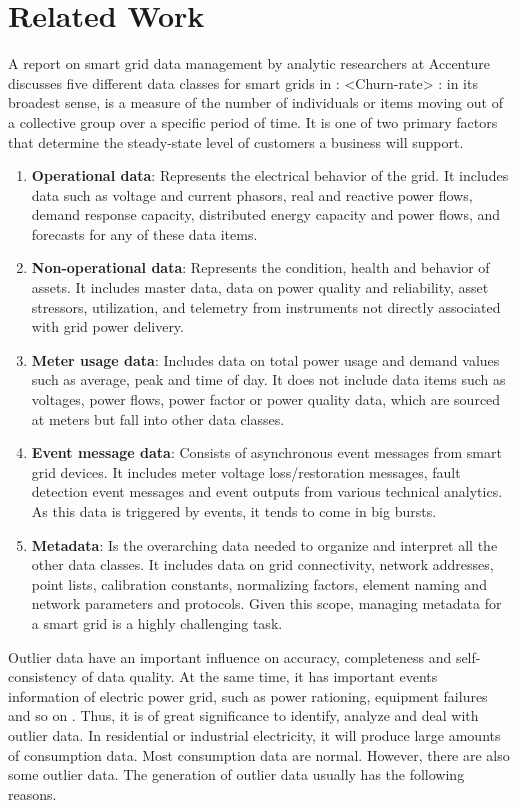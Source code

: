 \chapter{Related Work}
A report on smart grid data management by analytic researchers at Accenture discusses five different data classes for smart grids in \cite{analytics2010achieving}: 
<Churn-rate> : in its broadest sense, is a measure of the number of individuals or items moving out of a collective group over a specific period of time. It is one of two primary factors that determine the steady-state level of customers a business will support.
\begin{enumerate}
 \item \textbf{Operational data}: Represents the electrical behavior of the grid. It includes data such as voltage and current phasors, real and reactive power flows, demand response capacity, distributed energy capacity and power flows, and forecasts for any of these data items.
\item \textbf{Non-operational data}: Represents the condition, health and behavior of assets. It includes master data, data on power quality and reliability, asset stressors, utilization, and telemetry from instruments not directly associated with grid power delivery.
\item \textbf{Meter usage data}: Includes data on total power usage and demand values such as average, peak and time of day. It does not include data items such as voltages, power flows, power factor or power quality data, which are sourced at meters but fall into other data classes.
\item \textbf{Event message data}: Consists of asynchronous event messages from smart grid devices. It includes meter voltage loss/restoration messages, fault detection event messages and event outputs from various technical analytics. As this data is triggered by events, it tends to come in big bursts.
\item \textbf{Metadata}: Is the overarching data needed to organize and interpret all the other data classes. It includes data on grid connectivity, network addresses, point lists, calibration constants, normalizing factors, element naming and network parameters and protocols. Given this scope, managing metadata for a smart grid is a highly challenging task. 
\end{enumerate}
Outlier data have an important influence on accuracy, completeness and self-consistency of data quality. At the same time, it has important events information of electric power grid, such as power rationing, equipment failures and so on \cite{zhang2005new}. Thus, it is of great significance to identify, analyze and deal with outlier data. In residential or industrial electricity, it will produce large amounts of consumption data. Most consumption data are normal. However, there are also some outlier data. The generation of outlier data usually has the following reasons.
